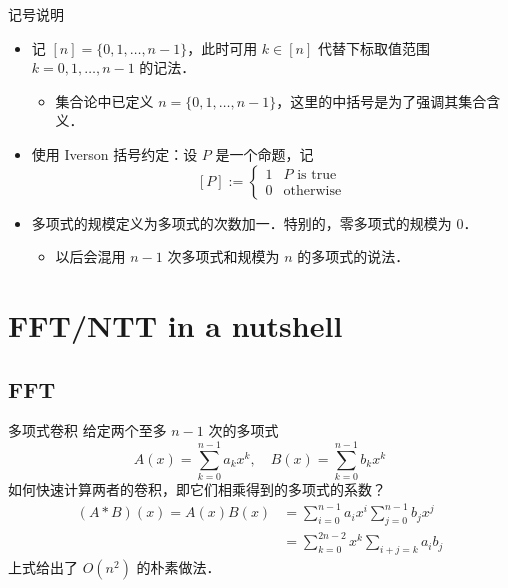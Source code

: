 \documentclass[fontset=fandol]{ctexbeamer}
\begin{document}
\begin{frame}{记号说明}
    \begin{itemize}
        \item 记 $[n] = \{ 0,1,\dots,n-1 \}$，此时可用 $k \in [n]$ 代替下标取值范围 $k=0,1,\dots,n-1$ 的记法．
        \begin{itemize}
            \item 集合论中已定义 $n = \{ 0,1,\dots,n-1 \}$，这里的中括号是为了强调其集合含义．
        \end{itemize}
        \item 使用 Iverson 括号约定：设 $P$ 是一个命题，记
        \[ [P] := \begin{cases}
        1 & \text{$P$ is true} \\
        0 & \text{otherwise}
        \end{cases} \]
        \item 多项式的规模定义为多项式的次数加一．特别的，零多项式的规模为 $0$．
        \begin{itemize}
            \item 以后会混用 $n-1$ 次多项式和规模为 $n$ 的多项式的说法．
        \end{itemize}
    \end{itemize}
\end{frame}

\section{FFT/NTT in a nutshell}

\subsection{FFT}

\begin{frame}{多项式卷积}
    给定两个至多 $n-1$ 次的多项式
    \[
        A(x) = \sum_{k=0}^{n-1} a_k x^k,\quad B(x) = \sum_{k=0}^{n-1} b_k x^k
    \]
    如何快速计算两者的卷积，即它们相乘得到的多项式的系数？
    \[
    \begin{aligned}
        (A*B)(x) = A(x)B(x) &= \sum_{i=0}^{n-1} a_i x^i \sum_{j=0}^{n-1} b_j x^j \\ 
        &= \sum_{k=0}^{2n-2} x^k \sum_{i+j=k} a_i b_j
    \end{aligned}
    \]
    上式给出了 $O(n^2)$ 的朴素做法．
\end{frame}
\end{document}
